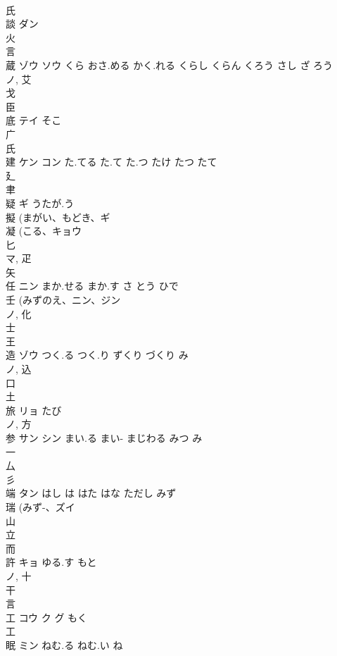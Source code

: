 \documentclass[8pt]{extreport}
\begin{document}
\begin{CJK}{UTF8}{min}
\\	氏 
\\	談	ダン		
\\	火 
\\	言 
\\	蔵	ゾウ ソウ	くら おさ.める かく.れる くらし くらん くろう さし ざ ろう	
\\	ノ, 艾 
\\	戈 
\\	臣 
\\	底	テイ	そこ	
\\	广 
\\	氏 
\\	建	ケン コン	た.てる た.て た.つ たけ たつ たて	
\\	廴 
\\	聿 
\\	疑	ギ	うたが.う	
\\	擬 (まがい、もどき、ギ 
\\	凝 (こる、キョウ 
\\	匕 
\\	マ, 疋 
\\	矢 
\\	任	ニン	まか.せる まか.す さ とう ひで	
\\	壬 (みずのえ、ニン、ジン 
\\	ノ, 化 
\\	士 
\\	王 
\\	造	ゾウ	つく.る つく.り ずくり づくり み	
\\	ノ, 込 
\\	口 
\\	土 
\\	旅	リョ	たび	
\\	ノ, 方 
\\	参	サン シン	まい.る まい- まじわる みつ み	
\\	一 
\\	厶 
\\	彡 
\\	端	タン	はし は はた はな ただし みず	
\\	瑞 (みず-、ズイ 
\\	山 
\\	立 
\\	而 
\\	許	キョ	ゆる.す もと	
\\	ノ, 十 
\\	干 
\\	言 
\\	工	コウ ク グ	もく	
\\	工 
\\	眠	ミン	ねむ.る ねむ.い ね	

\end{CJK}
\end{document}
